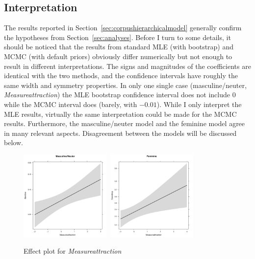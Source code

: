 \documentclass[USenglish]{article}
\begin{document}
\subsection{Interpretation}
\label{sec:interpretation}

The results reported in Section~\ref{sec:corpushierarchicalmodel} generally confirm the hypotheses from Section~\ref{sec:analyses}.
Before I turn to some details, it should be noticed that the results from standard MLE (with bootstrap) and MCMC (with default priors) obviously differ numerically but not enough to result in different interpretations.
The signs and magnitudes of the coefficients are identical with the two methods, and the confidence intervals have roughly the same width and symmetry properties.
In only one single case (masculine\slash neuter, \textit{Measureattraction}) the MLE bootstrap confidence interval does not include $0$ while the MCMC interval does (barely, with $-0.01$).
While I only interpret the MLE results, virtually the same interpretation could be made for the MCMC results.
Furthermore, the masculine\slash neuter model and the feminine model agree in many relevant aspects.
Disagreement between the models will be discussed below.


\begin{figure}[h!]
  \centering
  \includegraphics[width=0.4\textwidth]{figures/corpus/04_glmm_fixeff_mn_Measureattraction}~\includegraphics[width=0.4\textwidth]{figures/corpus/04_glmm_fixeff_fem_Measureattraction}
  \caption{Effect plot for \textit{Measureattraction}}
  \label{fig:eff:measureattraction}
\end{figure}
\end{document}
